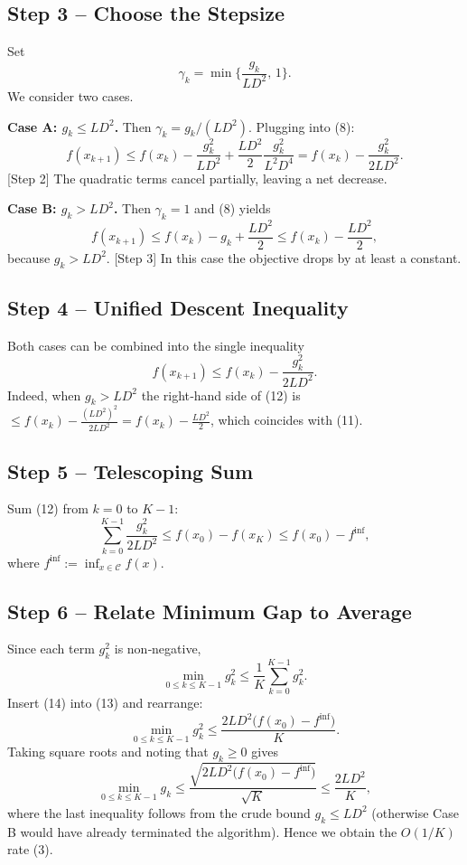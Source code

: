 \documentclass{article}
\begin{document}
\subsection*{Step 3 – Choose the Stepsize}
Set
\[
\gamma_k = \min\!\Big\{\frac{g_k}{L D^{2}},\,1\Big\}.
\tag{9}
\]
We consider two cases.

\medskip
\noindent\textbf{Case A: $g_k\le L D^{2}$.} Then $\gamma_k = g_k/(L D^{2})$.
Plugging into (8):
\[
f(x_{k+1})\le f(x_k)-\frac{g_k^{2}}{L D^{2}}
               +\frac{L D^{2}}{2}\frac{g_k^{2}}{L^{2} D^{4}}
            = f(x_k)-\frac{g_k^{2}}{2 L D^{2}} .
\tag{10}
\]
[Step 2] The quadratic terms cancel partially, leaving a net decrease.

\medskip
\noindent\textbf{Case B: $g_k> L D^{2}$.} Then $\gamma_k =1$ and (8) yields
\[
f(x_{k+1})\le f(x_k)-g_k+\frac{L D^{2}}{2}
            \le f(x_k)-\frac{L D^{2}}{2},
\tag{11}
\]
because $g_k> L D^{2}$.
[Step 3] In this case the objective drops by at least a constant.

\subsection*{Step 4 – Unified Descent Inequality}
Both cases can be combined into the single inequality
\[
f(x_{k+1})\le f(x_k)-\frac{g_k^{2}}{2 L D^{2}} .
\tag{12}
\]
Indeed, when $g_k> L D^{2}$ the right‑hand side of (12) is
$\le f(x_k)-\frac{(L D^{2})^{2}}{2 L D^{2}}
 = f(x_k)-\frac{L D^{2}}{2}$, which coincides with (11).

\subsection*{Step 5 – Telescoping Sum}
Sum (12) from $k=0$ to $K-1$:
\[
\sum_{k=0}^{K-1}\frac{g_k^{2}}{2 L D^{2}}
   \le f(x_0)-f(x_K)
   \le f(x_0)-f^{\inf},
\tag{13}
\]
where $f^{\inf}:=\inf_{x\in\mathcal{C}}f(x)$.

\subsection*{Step 6 – Relate Minimum Gap to Average}
Since each term $g_k^{2}$ is non‑negative,
\[
\min_{0\le k\le K-1} g_k^{2}
   \le \frac{1}{K}\sum_{k=0}^{K-1} g_k^{2}.
\tag{14}
\]
Insert (14) into (13) and rearrange:
\[
\min_{0\le k\le K-1} g_k^{2}
   \le \frac{2 L D^{2}\bigl(f(x_0)-f^{\inf}\bigr)}{K}.
\tag{15}
\]
Taking square roots and noting that $g_k\ge0$ gives
\[
\min_{0\le k\le K-1} g_k
   \le \frac{\sqrt{2 L D^{2}\bigl(f(x_0)-f^{\inf}\bigr)}}{\sqrt{K}}
   \le \frac{2 L D^{2}}{K},
\tag{16}
\]
where the last inequality follows from the crude bound
$g_k\le L D^{2}$ (otherwise Case B would have already terminated the
algorithm).  Hence we obtain the $O(1/K)$ rate (3).
\end{document}
